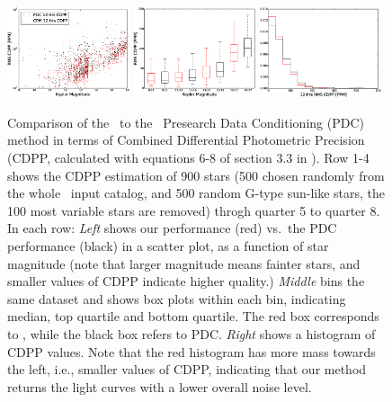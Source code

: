 \begin{figure}[p]
\begin{center}
\includegraphics[width=0.32\textwidth]{figures/cpm/f6j}
\includegraphics[width=0.32\textwidth]{figures/cpm/f6k}
\includegraphics[width=0.32\textwidth]{figures/cpm/f6l}
\end{center}
\caption{
  \label{cdpp} 
  Comparison of the \name\ to the \Kepler\ Presearch Data Conditioning (PDC) method in terms of Combined Differential Photometric Precision (CDPP, calculated with equations 6-8 of section 3.3 in \citealt{cdpp1}).
  Row 1-4 shows the CDPP estimation of 900 stars (500 chosen randomly from the whole \Kepler\ input catalog, and 500 random G-type sun-like stars, the 100 most variable stars are removed) throgh quarter 5 to quarter 8. In each row:
  \emph{Left} shows our performance (red) vs.\ the PDC performance (black) in a scatter plot, as a function of star magnitude (note that larger magnitude means fainter stars, and smaller values of CDPP indicate higher quality.)
  \emph{Middle} bins the same dataset and shows box plots within each bin, indicating median, top quartile and bottom quartile. 
  The red box corresponds to \name, while the black box refers to PDC. 
  \emph{Right} shows a histogram of CDPP values. 
  Note that the red histogram has more mass towards the left, i.e., smaller values of CDPP, 
    indicating that our method returns the light curves with a lower overall noise level.
}
\end{figure}

